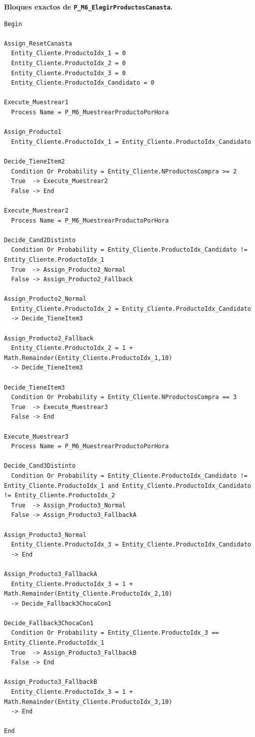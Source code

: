 \documentclass[11pt]{article}
\newcommand{\proc}[1]{\texttt{#1}}
\begin{document}
\textbf{Bloques exactos de \proc{P\_M6\_ElegirProductosCanasta}.}

\begin{lstlisting}[caption={Bloques de P M6 ElegirProductosCanasta}]
Begin

Assign_ResetCanasta
  Entity_Cliente.ProductoIdx_1 = 0
  Entity_Cliente.ProductoIdx_2 = 0
  Entity_Cliente.ProductoIdx_3 = 0
  Entity_Cliente.ProductoIdx_Candidato = 0

Execute_Muestrear1
  Process Name = P_M6_MuestrearProductoPorHora

Assign_Producto1
  Entity_Cliente.ProductoIdx_1 = Entity_Cliente.ProductoIdx_Candidato

Decide_TieneItem2
  Condition Or Probability = Entity_Cliente.NProductosCompra >= 2
  True  -> Execute_Muestrear2
  False -> End

Execute_Muestrear2
  Process Name = P_M6_MuestrearProductoPorHora

Decide_Cand2Distinto
  Condition Or Probability = Entity_Cliente.ProductoIdx_Candidato != Entity_Cliente.ProductoIdx_1
  True  -> Assign_Producto2_Normal
  False -> Assign_Producto2_Fallback

Assign_Producto2_Normal
  Entity_Cliente.ProductoIdx_2 = Entity_Cliente.ProductoIdx_Candidato
  -> Decide_TieneItem3

Assign_Producto2_Fallback
  Entity_Cliente.ProductoIdx_2 = 1 + Math.Remainder(Entity_Cliente.ProductoIdx_1,10)
  -> Decide_TieneItem3

Decide_TieneItem3
  Condition Or Probability = Entity_Cliente.NProductosCompra == 3
  True  -> Execute_Muestrear3
  False -> End

Execute_Muestrear3
  Process Name = P_M6_MuestrearProductoPorHora

Decide_Cand3Distinto
  Condition Or Probability = Entity_Cliente.ProductoIdx_Candidato != Entity_Cliente.ProductoIdx_1 and Entity_Cliente.ProductoIdx_Candidato != Entity_Cliente.ProductoIdx_2
  True  -> Assign_Producto3_Normal
  False -> Assign_Producto3_FallbackA

Assign_Producto3_Normal
  Entity_Cliente.ProductoIdx_3 = Entity_Cliente.ProductoIdx_Candidato
  -> End

Assign_Producto3_FallbackA
  Entity_Cliente.ProductoIdx_3 = 1 + Math.Remainder(Entity_Cliente.ProductoIdx_2,10)
  -> Decide_Fallback3ChocaCon1

Decide_Fallback3ChocaCon1
  Condition Or Probability = Entity_Cliente.ProductoIdx_3 == Entity_Cliente.ProductoIdx_1
  True  -> Assign_Producto3_FallbackB
  False -> End

Assign_Producto3_FallbackB
  Entity_Cliente.ProductoIdx_3 = 1 + Math.Remainder(Entity_Cliente.ProductoIdx_3,10)
  -> End

End
\end{lstlisting}
\end{document}
